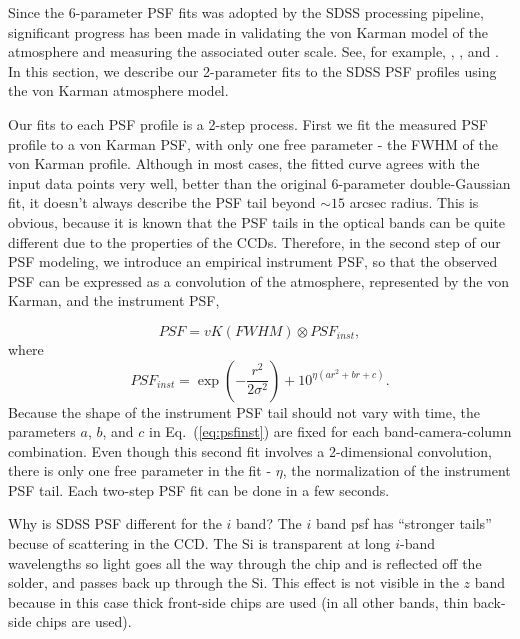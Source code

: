 

Since the 6-parameter PSF fits was adopted by the SDSS processing
pipeline, significant progress has been made in validating the von
Karman model of the atmosphere and measuring the associated outer
scale. See, for example, \cite{Tokovinin2002},
\cite{Boccas2004}, and \cite{MartinezMessenger}.
In this section, we describe our 2-parameter fits to the SDSS PSF
profiles using the von Karman atmosphere model.

Our fits to each PSF profile is a 2-step process. First we fit the
measured PSF profile to a von Karman PSF, with only one free parameter -
the FWHM of the von Karman profile. Although in most cases, the fitted
curve agrees with the input data points very well, better than the
original 6-parameter double-Gaussian fit, it doesn't always describe
the PSF tail beyond $\sim 15$ arcsec radius. This is obvious, because
it is known that the PSF tails in the optical bands can be quite
different due to the properties of the CCDs.
Therefore, in the second step of our PSF modeling, we introduce an
empirical instrument PSF, so that the observed PSF can be expressed as
a convolution of the atmosphere, represented by the von Karman, and
the instrument PSF,

\begin{equation}
        PSF = vK (FWHM) \otimes PSF_{inst},
\end{equation} 
where
\begin{equation}
        PSF_{inst} = \exp(-\frac{r^2}{2\sigma^2}) + 10^{\eta(ar^2+br+c)}.
\label{eq:psfinst}
\end{equation} 
Because the shape of the instrument PSF tail should not vary with
time, the parameters $a$, $b$, and $c$ in Eq.~(\ref{eq:psfinst}) are
fixed for each band-camera-column combination.
Even though this second fit involves a 2-dimensional convolution,
there is only one free parameter in the fit - 
$\eta$, the normalization of the instrument PSF tail.
Each two-step PSF fit can be done in a few seconds.



Why is SDSS PSF different for the $i$ band? The $i$ band psf has ``stronger tails''
becuse of scattering in the CCD.  The Si is transparent at long $i$-band wavelengths 
so light goes all the way through the chip and is reflected off the solder, and passes 
back up through the Si. This effect is not visible in the $z$ band because in this case
thick front-side chips are used (in all other bands, thin back-side chips are used). 

